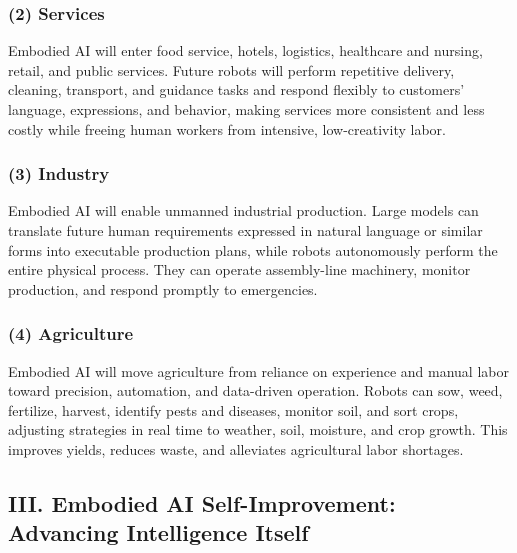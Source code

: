 \hypertarget{services}{%
\subsubsection{(2) Services}\label{services}}

Embodied AI will enter food service, hotels, logistics, healthcare and nursing, retail, and public services. Future robots will perform repetitive delivery, cleaning, transport, and guidance tasks and respond flexibly to customers' language, expressions, and behavior, making services more consistent and less costly while freeing human workers from intensive, low-creativity labor.

\hypertarget{industry}{%
\subsubsection{(3) Industry}\label{industry}}

Embodied AI will enable unmanned industrial production. Large models can translate future human requirements expressed in natural language or similar forms into executable production plans, while robots autonomously perform the entire physical process. They can operate assembly-line machinery, monitor production, and respond promptly to emergencies.

\hypertarget{agriculture}{%
\subsubsection{(4) Agriculture}\label{agriculture}}

Embodied AI will move agriculture from reliance on experience and manual labor toward precision, automation, and data-driven operation. Robots can sow, weed, fertilize, harvest, identify pests and diseases, monitor soil, and sort crops, adjusting strategies in real time to weather, soil, moisture, and crop growth. This improves yields, reduces waste, and alleviates agricultural labor shortages.

\hypertarget{iii.-embodied-ai-self-improvement-advancing-intelligence-itself}{%
\subsection{III. Embodied AI Self-Improvement: Advancing Intelligence Itself}\label{iii.-embodied-ai-self-improvement-advancing-intelligence-itself}}

